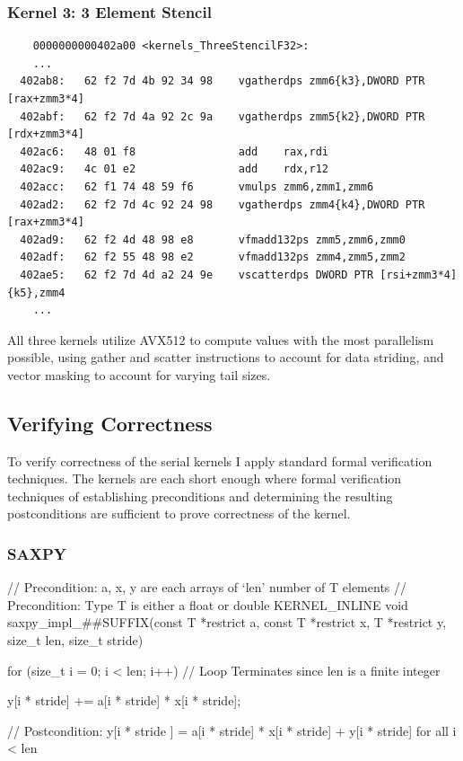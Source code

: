 \documentclass[11pt]{article}
\begin{document}
\subsubsection{Kernel 3: 3 Element Stencil}

\begin{verbatim}
	0000000000402a00 <kernels_ThreeStencilF32>:
	...
  402ab8:	62 f2 7d 4b 92 34 98 	vgatherdps zmm6{k3},DWORD PTR [rax+zmm3*4]
  402abf:	62 f2 7d 4a 92 2c 9a 	vgatherdps zmm5{k2},DWORD PTR [rdx+zmm3*4]
  402ac6:	48 01 f8             	add    rax,rdi
  402ac9:	4c 01 e2             	add    rdx,r12
  402acc:	62 f1 74 48 59 f6    	vmulps zmm6,zmm1,zmm6
  402ad2:	62 f2 7d 4c 92 24 98 	vgatherdps zmm4{k4},DWORD PTR [rax+zmm3*4]
  402ad9:	62 f2 4d 48 98 e8    	vfmadd132ps zmm5,zmm6,zmm0
  402adf:	62 f2 55 48 98 e2    	vfmadd132ps zmm4,zmm5,zmm2
  402ae5:	62 f2 7d 4d a2 24 9e 	vscatterdps DWORD PTR [rsi+zmm3*4]{k5},zmm4
	...
\end{verbatim}

All three kernels utilize AVX512 to compute values with the most parallelism possible, using gather and scatter
instructions to account for data striding, and vector masking to account for varying tail sizes.

\subsection{Verifying Correctness}

To verify correctness of the serial kernels I apply standard formal verification techniques. The kernels are each short
enough where formal verification techniques of establishing preconditions and determining the resulting postconditions
are sufficient to prove correctness of the kernel.

\subsubsection{SAXPY}
\begin{ccode}[caption={SAXPY kernel (C)}, label={lst:c-example}]
	// Precondition: a, x, y are each arrays of `len' number of T elements
	// Precondition: Type T is either a float or double
	KERNEL_INLINE void saxpy_impl_##SUFFIX(const T *restrict a,
	const T *restrict x, T *restrict y,
	size_t len, size_t stride) 																													{

			for (size_t i = 0; i < len; i++) // Loop Terminates since len is a finite integer

			y[i * stride] += a[i * stride] * x[i * stride];

		} // Postcondition: y[i * stride ] = a[i * stride] * x[i * stride] + y[i * stride] for all i < len
\end{ccode}
\end{document}
